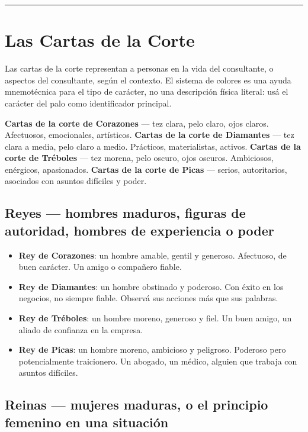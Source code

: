 \begin{center}\rule{0.5\linewidth}{0.5pt}\end{center}

\section{Las Cartas de la Corte}\label{the-court-cards}

Las cartas de la corte representan a personas en la vida del consultante, o aspectos del consultante, según el contexto. El sistema de colores es una ayuda mnemotécnica para el tipo de carácter, no una descripción física literal: usá el carácter del palo como identificador principal.

\textbf{Cartas de la corte de Corazones} --- tez clara, pelo claro, ojos claros. Afectuosos, emocionales, artísticos. \textbf{Cartas de la corte de Diamantes} --- tez clara a media, pelo claro a medio. Prácticos, materialistas, activos. \textbf{Cartas de la corte de Tréboles} --- tez morena, pelo oscuro, ojos oscuros. Ambiciosos, enérgicos, apasionados. \textbf{Cartas de la corte de Picas} --- serios, autoritarios, asociados con asuntos difíciles y poder.

\subsection{Reyes --- hombres maduros, figuras de autoridad, hombres de experiencia o poder}\label{kings--mature-men-authority-figures-men-of-expertise-or-power}

\begin{itemize}
\tightlist
\item
  \textbf{Rey de Corazones}: un hombre amable, gentil y generoso. Afectuoso, de buen carácter. Un amigo o compañero fiable.
\item
  \textbf{Rey de Diamantes}: un hombre obstinado y poderoso. Con éxito en los negocios, no siempre fiable. Observá sus acciones más que sus palabras.
\item
  \textbf{Rey de Tréboles}: un hombre moreno, generoso y fiel. Un buen amigo, un aliado de confianza en la empresa.
\item
  \textbf{Rey de Picas}: un hombre moreno, ambicioso y peligroso. Poderoso pero potencialmente traicionero. Un abogado, un médico, alguien que trabaja con asuntos difíciles.
\end{itemize}

\subsection{Reinas --- mujeres maduras, o el principio femenino en una situación}\label{queens--mature-women-or-the-feminine-principle-in-a-situation}

